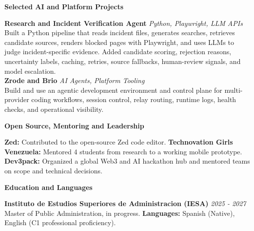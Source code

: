 \documentclass[10pt]{article}
\newcommand{\sectiontitle}[1]{%
    \vspace{4pt}
    \begin{center}
        \textbf{#1}
    \end{center}
    \vspace{-5pt}
}
\begin{document}
\sectiontitle{Selected AI and Platform Projects}
\textbf{Research and Incident Verification Agent} \hfill \textit{Python, Playwright, LLM APIs} \\
Built a Python pipeline that reads incident files, generates searches, retrieves candidate sources, renders blocked pages with Playwright, and uses LLMs to judge incident-specific evidence. Added candidate scoring, rejection reasons, uncertainty labels, caching, retries, source fallbacks, human-review signals, and model escalation. \\
\textbf{Zrode and Brio} \hfill \textit{AI Agents, Platform Tooling} \\
Build and use an agentic development environment and control plane for multi-provider coding workflows, session control, relay routing, runtime logs, health checks, and operational visibility.

\sectiontitle{Open Source, Mentoring and Leadership}
\textbf{Zed:} Contributed to the open-source Zed code editor. \textbf{Technovation Girls Venezuela:} Mentored 4 students from research to a working mobile prototype. \textbf{Dev3pack:} Organized a global Web3 and AI hackathon hub and mentored teams on scope and technical decisions.

\sectiontitle{Education and Languages}
\textbf{Instituto de Estudios Superiores de Administracion (IESA)} \hfill \textit{2025 - 2027} \\
Master of Public Administration, in progress. \textbf{Languages:} Spanish (Native), English (C1 professional proficiency).
\end{document}
